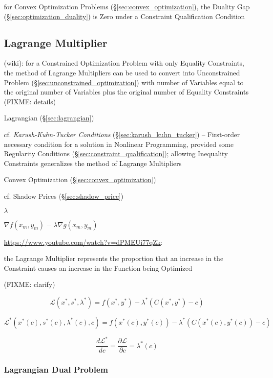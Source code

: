 for Convex Optimization Problems (\S\ref{sec:convex_optimization}), the Duality
Gap (\S\ref{sec:optimization_duality}) is Zero under a Constraint Qualification
Condition



\subsection{Lagrange Multiplier}\label{sec:lagrange_multiplier}

(wiki): for a Constrained Optimization Problem with only Equality Constraints,
the method of Lagrange Multipliers can be used to convert into Unconstrained
Problem (\S\ref{sec:unconstrained_optimization}) with number of Variables equal
to the original number of Variables plus the original number of Equality
Constraints (FIXME: details)

\fist Lagrangian (\S\ref{sec:lagrangian})

\fist cf. \emph{Karush-Kuhn-Tucker Conditions} (\S\ref{sec:karush_kuhn_tucker})
-- First-order necessary condition for a solution in Nonlinear Programming,
provided some Regularity Conditions (\S\ref{sec:constraint_qualification});
allowing Inequality Constraints generalizes the method of Lagrange Multipliers

\fist Convex Optimization (\S\ref{sec:convex_optimization})

cf. Shadow Prices (\S\ref{sec:shadow_price})

$\lambda$

$\nabla f(x_m, y_m) = \lambda\nabla g(x_m, y_m)$

\url{https://www.youtube.com/watch?v=dPMEUi77qZk}:

the Lagrange Multiplier represents the proportion that an increase in the
Constraint causes an increase in the Function being Optimized

(FIXME: clarify)

\[
  \mathcal{L}(x^*,s^*,\lambda^*) = f(x^*,y^*) - \lambda^*(C(x^*,y^*)-c)
\]

\[
  \mathcal{L}^*(x^*(c),s^*(c),\lambda^*(c), c)
    = f(x^*(c),y^*(c)) - \lambda^*(C(x^*(c),y^*(c))-c)
\]

\[
  \frac{d\mathcal{L}^*}{dc} = \frac{\partial{\mathcal{L}}}{\partial{c}} =
  \lambda^*(c)
\]



\subsubsection{Lagrangian Dual Problem}\label{sec:lagrangian_dual}

